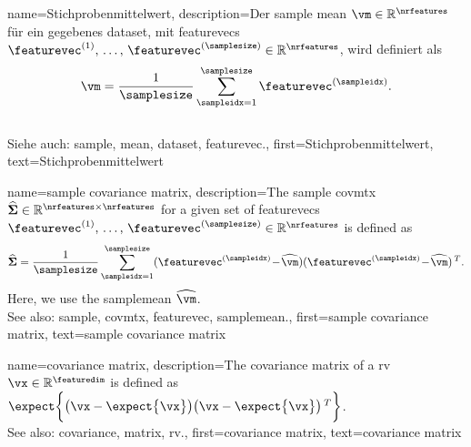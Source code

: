 {{{{
{
    name={Stichprobenmittelwert}, 
    description={Der \gls{sample} \gls{mean} 
                 $\vm \in \mathbb{R}^{\nrfeatures}$ für ein gegebenes \gls{dataset}, 
                 mit \glspl{featurevec} $\featurevec^{(1)}, \,\ldots, \,\featurevec^{(\samplesize)} \in \mathbb{R}^{\nrfeatures}$, 
                 wird definiert als 
                 $$\vm = \frac{1}{\samplesize} \sum_{\sampleidx=1}^{\samplesize} \featurevec^{(\sampleidx)}.$$ 
                 \\
                 Siehe auch: \gls{sample}, \gls{mean}, \gls{dataset}, \gls{featurevec}.},
    first={Stichprobenmittelwert},
    text={Stichprobenmittelwert} 
}

{name={sample covariance matrix}, 
	description={The 
		\gls{sample} \gls{covmtx} $\widehat{\bf \Sigma} \in \mathbb{R}^{\nrfeatures \times \nrfeatures}$ 
		for a given set of \glspl{featurevec} $\featurevec^{(1)}, \,\ldots, \,\featurevec^{(\samplesize)} \in \mathbb{R}^{\nrfeatures}$ is defined as 
		$$\widehat{\bf \Sigma} = \frac{1}{\samplesize} \sum_{\sampleidx=1}^{\samplesize} (\featurevec^{(\sampleidx)}\!-\!\widehat{\vm}) (\featurevec^{(\sampleidx)}\!-\!\widehat{\vm})\,^{T}.$$ 
		Here, we use the \gls{samplemean} $\widehat{\vm}$. 
				\\
		See also: \gls{sample}, \gls{covmtx}, \gls{featurevec}, \gls{samplemean}.},
	first={sample covariance matrix},
	text={sample covariance matrix} 
}

{name={covariance matrix}, 
	description={The \gls{covariance} \gls{matrix} of a \gls{rv} $\vx \in \mathbb{R}^{\featuredim}$ 
		is defined as $\expect \bigg \{ \big( \vx - \expect \big\{ \vx \big\} \big)  \big(\vx - \expect \big\{ \vx \big\} \big)\,^{T} \bigg\}$.
				\\
		See also: \gls{covariance}, \gls{matrix}, \gls{rv}.},
	first={covariance matrix},
	text={covariance matrix} 
}

}}}}
